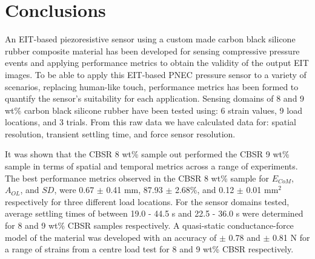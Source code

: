 
\section{Conclusions}\label{sec:Summary and Conclusions}


An EIT-based piezoresistive sensor using a custom made carbon black silicone rubber composite material has been developed for sensing compressive pressure events and applying performance metrics to obtain the validity of the output EIT images. To be able to apply this EIT-based PNEC pressure sensor to a variety of scenarios, replacing human-like touch, performance metrics has been formed to quantify the sensor's suitability for each application. Sensing domains of 8 and 9 wt\% carbon black silicone rubber have been tested using: 6 strain values, 9 load locations, and 3 trials. From this raw data we have calculated data for: spatial resolution, transient settling time, and force sensor resolution. 

It was shown that the CBSR 8 wt\% sample out performed the CBSR 9 wt\% sample in terms of spatial and temporal metrics across a range of experiments. The best performance metrics observed in the CBSR 8 wt\% sample for $E_{CoM}$, $A_{OL}$, and $S\!D$, were 0.67 $\pm$ 0.41 mm, 87.93 $\pm$ 2.68\%, and 0.12 $\pm$ 0.01 mm$^2$ respectively for three different load locations. For the sensor domains tested, average settling times of between 19.0 - 44.5 s and 22.5 - 36.0 s were determined for 8 and 9 wt\% CBSR samples respectively. A quasi-static conductance-force model of the material was developed with an accuracy of  $\pm$ 0.78 and  $\pm$ 0.81 N for a range of strains from a centre load test for 8 and 9 wt\% CBSR respectively.

